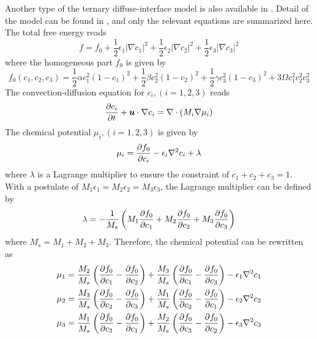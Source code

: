 Another type of the ternary diffuse-interface model is also available in \tfem.
Detail of the model can be found in \cite{Boyer2006},
and only the relevant equations are summarized here.
The total free energy reads
\begin{equation}
f = f_0 + \frac{1}{2} \epsilon_1 | \nabla c_1 |^2
        + \frac{1}{2} \epsilon_2 | \nabla c_2 |^2
        + \frac{1}{2} \epsilon_3 | \nabla c_3 |^2
\end{equation}
where the homogeneous part $f_0$ is given by
\begin{equation}
f_0(c_1, c_2, c_3)
    = \frac{1}{2} \alpha c_1^2 \left( 1 - c_1 \right)^2
    + \frac{1}{2} \beta c_2^2 \left( 1 - c_2 \right)^2
    + \frac{1}{2} \gamma c_3^2 \left( 1 - c_3 \right)^2
    + 3 \Omega c_1^2 c_2^2 c_3^2
\end{equation}
The convection-diffusion equation for $c_i, (i = 1, 2, 3)$ reads
\begin{equation}
\dfrac{\partial c_i}{\partial t} + \boldsymbol{u} \cdot \nabla c_i =
\nabla \cdot \left( M_i \nabla \mu_i \right)
\end{equation}
The chemical potential $\mu_i, (i = 1, 2, 3)$ is given by
\begin{equation}
\mu_i = \dfrac{\partial f_0}{\partial c_i} - \epsilon_i \nabla^2 c_i + \lambda
\end{equation}
where $\lambda$ is a Lagrange multiplier
to ensure the constraint of $c_1 + c_2 + c_3 = 1$.
With a postulate of $M_1 \epsilon_1 = M_2 \epsilon_2 = M_3 \epsilon_3$,
the Lagrange multiplier can be defined by
\begin{equation}
\lambda = - \frac{1}{M_s} \left( M_1 \dfrac{\partial f_0}{\partial c_1}
        + M_2 \dfrac{\partial f_0}{\partial c_2}
        + M_3 \dfrac{\partial f_0}{\partial c_3} \right)
\end{equation}
where $M_s = M_1 + M_2 + M_3$.
Therefore, the chemical potential can be rewritten as
\begin{align}
\mu_1 = \frac{M_2}{M_s} \left( \dfrac{\partial f_0}{\partial c_1} - \dfrac{\partial f_0}{\partial c_2} \right)
      + \frac{M_3}{M_s} \left( \dfrac{\partial f_0}{\partial c_1} - \dfrac{\partial f_0}{\partial c_3} \right)
      - \epsilon_1 \nabla^2 c_1
\\
\mu_2 = \frac{M_3}{M_s} \left( \dfrac{\partial f_0}{\partial c_2} - \dfrac{\partial f_0}{\partial c_3} \right)
      + \frac{M_1}{M_s} \left( \dfrac{\partial f_0}{\partial c_2} - \dfrac{\partial f_0}{\partial c_1} \right)
      - \epsilon_2 \nabla^2 c_2
\\
\mu_3 = \frac{M_1}{M_s} \left( \dfrac{\partial f_0}{\partial c_3} - \dfrac{\partial f_0}{\partial c_1} \right)
      + \frac{M_2}{M_s} \left( \dfrac{\partial f_0}{\partial c_3} - \dfrac{\partial f_0}{\partial c_2} \right)
      - \epsilon_3 \nabla^2 c_3
\end{align}
